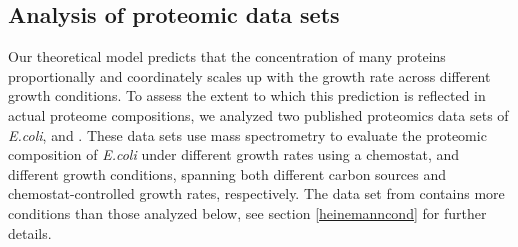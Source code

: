 \subsection{Analysis of proteomic data sets}
Our theoretical model predicts that the concentration of many proteins proportionally and coordinately scales up with the growth rate across different growth conditions.
To assess the extent to which this prediction is reflected in actual proteome compositions, we analyzed two published proteomics data sets of \emph{E.coli}, \cite{Peebo_2015} and \cite{Heinemann2015}.
These data sets use mass spectrometry to evaluate the proteomic composition of \emph{E.coli} under \vConds{} different growth rates using a chemostat, and \hConds{} different growth conditions, spanning both different carbon sources and chemostat-controlled growth rates, respectively.
The data set from \cite{Heinemann2015} contains more conditions than those analyzed below, see section \ref{heinemanncond} for further details.